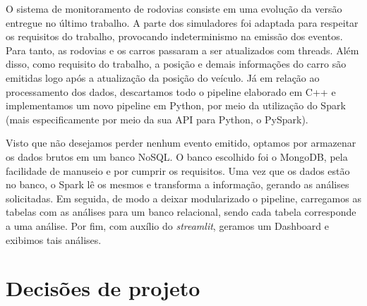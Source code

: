 \documentclass{article}
\begin{document}
O sistema de monitoramento de rodovias consiste em uma evolução da versão entregue no último trabalho. A parte dos simuladores foi adaptada para respeitar os requisitos do trabalho, provocando indeterminismo na emissão dos eventos. Para tanto, as rodovias e os carros passaram a ser atualizados com threads. Além disso, como requisito do trabalho, a posição e demais informações do carro são emitidas logo após a atualização da posição do veículo. Já em relação ao processamento dos dados, descartamos todo o pipeline elaborado em C++ e implementamos um novo pipeline em Python, por meio da utilização do Spark (mais especificamente por meio da sua API para Python, o PySpark).

Visto que não desejamos perder nenhum evento emitido, optamos por armazenar os dados brutos em um banco NoSQL. O banco escolhido foi o MongoDB, pela facilidade de manuseio e por cumprir os requisitos. Uma vez que os dados estão no banco, o Spark lê os mesmos e transforma a informação, gerando as análises solicitadas. Em seguida, de modo a deixar modularizado o pipeline, carregamos as tabelas com as análises para um banco relacional, sendo cada tabela corresponde a uma análise. Por fim, com auxílio do \textit{streamlit}, geramos um Dashboard e exibimos tais análises.

\section*{Decisões de projeto}
\end{document}
